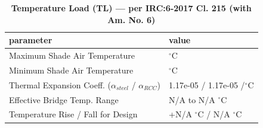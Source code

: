 \documentclass[12pt,a4paper]{report}
\numberwithin{table}{chapter}
\numberwithin{figure}{chapter}
\begin{document}
\vspace{1em}
\begin{longtable}{|L{6.0cm}|p{9.5cm}|}
\caption{\textbf{Temperature Load (TL) --- per IRC:6-2017 Cl. 215 (with Am. No. 6)}}
\\
\hline
\textbf{parameter} & \textbf{value} \\
\hline
\textnormal{Maximum Shade Air Temperature} &  $^\circ$C \\[6pt]
\hline
\textnormal{Minimum Shade Air Temperature} &  $^\circ$C \\[6pt]
\hline
\textnormal{Thermal Expansion Coeff. ($\alpha_{steel}$ / $\alpha_{RCC}$)} & 1.17e-05 / 1.17e-05 /$^\circ$C \\[6pt]
\hline
\textnormal{Effective Bridge Temp. Range} & N/A to N/A $^\circ$C \\[6pt]
\hline
\textnormal{Temperature Rise / Fall for Design} & +N/A $^\circ$C / \textminus{}N/A $^\circ$C \\[6pt]
\hline
\end{longtable}
\end{document}
